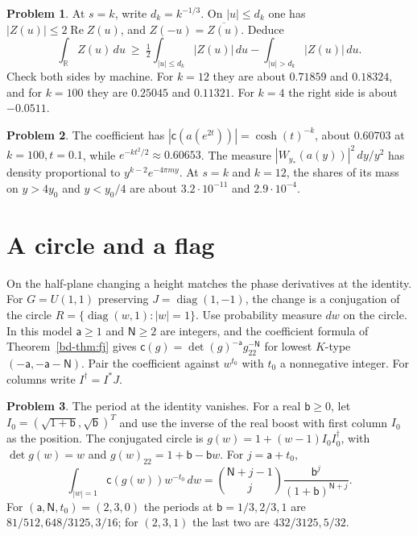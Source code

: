 \documentclass[reqno]{amsart}
\theoremstyle{definition}
\newtheorem{problem}{Problem}[section]
\theoremstyle{plain}
\theoremstyle{remark}
\newcommand{\R}{\mathbb R}
\newcommand{\cf}{\mathsf c}
\newcommand{\diag}{\operatorname{diag}}
\begin{document}
\begin{problem}\label{pr:cone}
At \(s=k\), write \(d_k=k^{-1/3}\).  On \(|u|\le d_k\) one has \(|Z(u)|\le2\operatorname{Re}Z(u)\), and \(Z(-u)=\overline{Z(u)}\).  Deduce
\[
 \int_{\R} Z(u)\,du\ \ge\
 \tfrac12\int_{|u|\le d_k}|Z(u)|\,du-\int_{|u|>d_k}|Z(u)|\,du .
\]
Check both sides by machine.  For \(k=12\) they are about \(0.71859\) and \(0.18324\), and for \(k=100\) they are \(0.25045\) and \(0.11321\).  For \(k=4\) the right side is about \(-0.0511\).
\end{problem}

\begin{problem}\label{pr:tail}
The coefficient has \(|\cf(a(e^{2t}))|=\cosh(t)^{-k}\), about \(0.60703\) at \(k=100,t=0.1\), while \(e^{-kt^2/2}\approx0.60653\).  The measure \(|W_{y_*}(a(y))|^2\,dy/y^2\) has density proportional to \(y^{k-2}e^{-4\pi my}\).  At \(s=k\) and \(k=12\), the shares of its mass on \(y>4y_0\) and \(y<y_0/4\) are about \(3.2\cdot10^{-11}\) and \(2.9\cdot10^{-4}\).
\end{problem}

\section{A circle and a flag}\label{sec:positions}

On the half-plane changing a height matches the phase derivatives at the identity.  For \(G=U(1,1)\) preserving \(J=\diag(1,-1)\), the change is a conjugation of the circle \(R=\{\diag(w,1):|w|=1\}\).  Use probability measure \(dw\) on the circle.  In this model \(\mathsf a\ge1\) and \(\mathsf N\ge2\) are integers, and the coefficient formula of Theorem~\ref{bd-thm:fj} gives \(\cf(g)=\det(g)^{-\mathsf a}g_{22}^{-\mathsf N}\) for lowest \(K\)-type \((-\mathsf a,-\mathsf a-\mathsf N)\).  Pair the coefficient against \(w^{t_0}\) with \(t_0\) a nonnegative integer.  For columns write \(I^\dagger=I^*J\).

\begin{problem}\label{pr:circle-period}
The period at the identity vanishes.  For a real \(\mathsf b\ge0\), let \(I_0=(\sqrt{1+\mathsf b},\sqrt{\mathsf b})^T\) and use the inverse of the real boost with first column \(I_0\) as the position.  The conjugated circle is \(g(w)=1+(w-1)I_0I_0^\dagger\), with \(\det g(w)=w\) and \(g(w)_{22}=1+\mathsf b-\mathsf b w\).  For \(j=\mathsf a+t_0\),
\[
 \int_{|w|=1}\cf(g(w))w^{-t_0}\,dw
 =\binom{\mathsf N+j-1}{j}\frac{\mathsf b^j}{(1+\mathsf b)^{\mathsf N+j}} .
\]
For \((\mathsf a,\mathsf N,t_0)=(2,3,0)\) the periods at \(\mathsf b=1/3,2/3,1\) are \(81/512,648/3125,3/16\); for \((2,3,1)\) the last two are \(432/3125,5/32\).
\end{problem}
\end{document}
